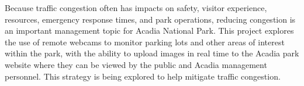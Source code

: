 \par Because traffic congestion often has impacts on safety, visitor experience, resources, emergency response times, and park operations, reducing congestion is an important management topic for Acadia National Park.  This project explores the use of remote webcams to monitor parking lots and other areas of interest within the park, with the ability to upload images in real time to the Acadia park website where they can be viewed by the public and Acadia management personnel.  This strategy is being explored to help mitigate traffic congestion.

